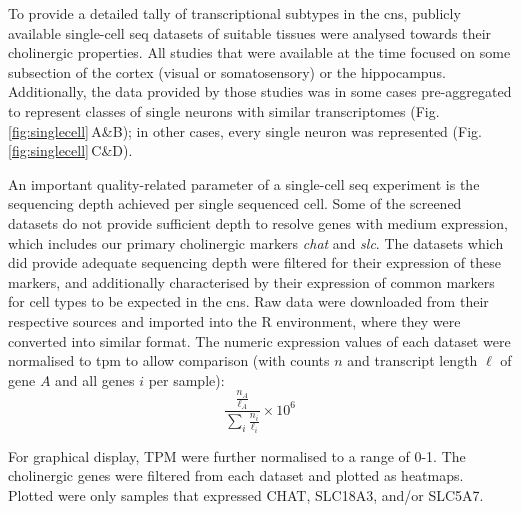 \begin{method}

To provide a detailed tally of transcriptional subtypes in the \ac{cns}, publicly available single-cell \ac{seq} datasets of suitable tissues were analysed towards their cholinergic properties. All studies that were available at the time focused on some subsection of the cortex (visual or somatosensory) or the hippocampus. Additionally, the data provided by those studies was in some cases pre-aggregated to represent classes of single neurons with similar transcriptomes (Fig.\,\ref{fig:singlecell}\,A\&B\cite{Zeisel2015, Tasic2016}); in other cases, every single neuron was represented (Fig.\,\ref{fig:singlecell}\,C\&D\cite{Darmanis2015, Habib2016}). 

An important quality-related parameter of a single-cell \ac{seq} experiment is the sequencing depth achieved per single sequenced cell. Some of the screened datasets do not provide sufficient depth to resolve genes with medium expression, which includes our primary cholinergic markers \textit{\ac{chat}} and \textit{\ac{slc}}. The datasets which did provide adequate sequencing depth were filtered for their expression of these markers, and additionally characterised by their expression of common markers for cell types to be expected in the \ac{cns}. Raw data were downloaded from their respective sources and imported into the R environment, where they were converted into similar format. The numeric expression values of each dataset were normalised to \ac{tpm} to allow comparison (with counts $n$ and transcript length $\ell$ of gene $A$ and all genes $i$ per sample): $$\frac{\frac{n_A}{\ell_A}}{\sum_i \frac{n_i}{\ell_i}}\times 10^6$$

For graphical display, TPM were further normalised to a range of \num{0}-\num{1}. The cholinergic genes were filtered from each dataset and plotted as heatmaps. Plotted were only samples that expressed CHAT, SLC18A3, and/or SLC5A7.

\end{method}

